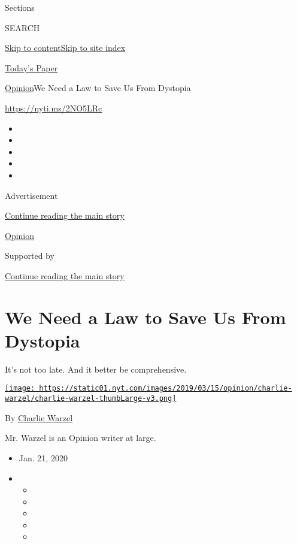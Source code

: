 Sections

SEARCH

\protect\hyperlink{site-content}{Skip to
content}\protect\hyperlink{site-index}{Skip to site index}

\href{https://myaccount.nytimes.com/auth/login?response_type=cookie\&client_id=vi}{}

\href{https://www.nytimes.com/section/todayspaper}{Today's Paper}

\href{/section/opinion}{Opinion}\textbar{}We Need a Law to Save Us From
Dystopia

\url{https://nyti.ms/2NO5LRc}

\begin{itemize}
\item
\item
\item
\item
\item
\end{itemize}

Advertisement

\protect\hyperlink{after-top}{Continue reading the main story}

\href{/section/opinion}{Opinion}

Supported by

\protect\hyperlink{after-sponsor}{Continue reading the main story}

\hypertarget{we-need-a-law-to-save-us-from-dystopia}{%
\section{We Need a Law to Save Us From
Dystopia}\label{we-need-a-law-to-save-us-from-dystopia}}

It's not too late. And it better be comprehensive.

\href{https://www.nytimes.com/by/charlie-warzel}{\texttt{[image: https://static01.nyt.com/images/2019/03/15/opinion/charlie-warzel/charlie-warzel-thumbLarge-v3.png]}}

By \href{https://www.nytimes.com/by/charlie-warzel}{Charlie Warzel}

Mr. Warzel is an Opinion writer at large.

\begin{itemize}
\item
  Jan. 21, 2020
\item
  \begin{itemize}
  \item
  \item
  \item
  \item
  \item
  \end{itemize}
\end{itemize}

